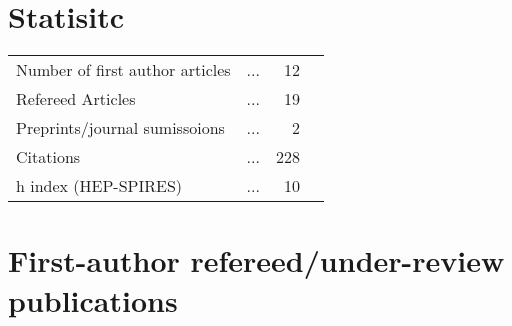 \documentclass[10pt,floatfix,a4paper]{article}
\begin{document}
\section*{Statisitc}
\begin{tabular}{ l l r l}
	Number of first author articles 	& ... & 12 \\
	Refereed Articles 					& ... & 19 \\
	Preprints/journal sumissoions 		& ... & 2  \\
	Citations 							& ... & 228 \\
	h index (HEP-SPIRES) 				& ... & 10 \\
\end{tabular}

\section*{First-author refereed/under-review publications}
\end{document}
